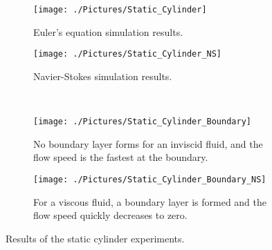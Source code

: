 \documentclass[10pt, titlepage]{article}
\begin{document}
\begin{figure}[htbp]
\centering
\begin{subfigure}[t]{0.5\textwidth}
  \centering
  \texttt{[image: ./Pictures/Static\_Cylinder]}
  \caption{Euler's equation simulation results.}
  \label{fig:staticeuler}
\end{subfigure}%
\begin{subfigure}[t]{0.5\textwidth}
  \centering
  \texttt{[image: ./Pictures/Static\_Cylinder\_NS]}
  \caption{Navier-Stokes simulation results.}
  \label{fig:staticNS}
\end{subfigure} \\
\begin{subfigure}[t]{0.5\textwidth}
 \centering
 \texttt{[image: ./Pictures/Static\_Cylinder\_Boundary]}
 \caption{No boundary layer forms for an inviscid fluid, and the flow speed is the fastest at the boundary.}
 \label{fig:eulerboundary}
\end{subfigure}%
\begin{subfigure}[t]{0.5\textwidth}
 \centering
 \texttt{[image: ./Pictures/Static\_Cylinder\_Boundary\_NS]}
 \caption{For a viscous fluid, a boundary layer is formed and the flow speed quickly decreases to zero.}
 \label{fig:nsboundary}
\end{subfigure}
\caption[Static Cylinder Results]{Results of the static cylinder experiments.}
\label{fig:static}
\end{figure}
\end{document}
